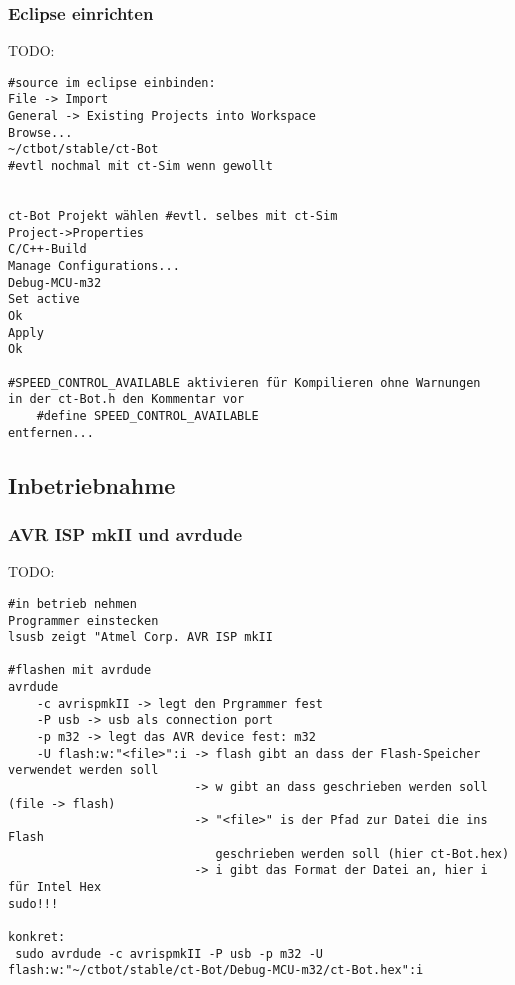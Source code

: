 \subsubsection{Eclipse einrichten}
TODO:
\begin{lstlisting}
#source im eclipse einbinden:
File -> Import
General -> Existing Projects into Workspace
Browse...
~/ctbot/stable/ct-Bot
#evtl nochmal mit ct-Sim wenn gewollt


ct-Bot Projekt wählen #evtl. selbes mit ct-Sim
Project->Properties
C/C++-Build
Manage Configurations...
Debug-MCU-m32
Set active
Ok
Apply
Ok

#SPEED_CONTROL_AVAILABLE aktivieren für Kompilieren ohne Warnungen
in der ct-Bot.h den Kommentar vor
    #define SPEED_CONTROL_AVAILABLE
entfernen...
\end{lstlisting}

\subsection{Inbetriebnahme}
\subsubsection{AVR ISP mkII und avrdude}
TODO:
\begin{lstlisting}
#in betrieb nehmen
Programmer einstecken
lsusb zeigt "Atmel Corp. AVR ISP mkII

#flashen mit avrdude
avrdude
    -c avrispmkII -> legt den Prgrammer fest
    -P usb -> usb als connection port
    -p m32 -> legt das AVR device fest: m32
    -U flash:w:"<file>":i -> flash gibt an dass der Flash-Speicher verwendet werden soll
                          -> w gibt an dass geschrieben werden soll (file -> flash)
                          -> "<file>" is der Pfad zur Datei die ins Flash 
                             geschrieben werden soll (hier ct-Bot.hex)
                          -> i gibt das Format der Datei an, hier i für Intel Hex
sudo!!!

konkret:
 sudo avrdude -c avrispmkII -P usb -p m32 -U flash:w:"~/ctbot/stable/ct-Bot/Debug-MCU-m32/ct-Bot.hex":i

\end{lstlisting}